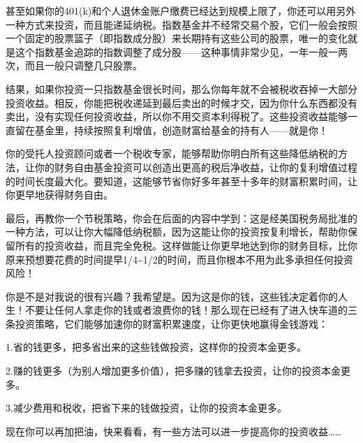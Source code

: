 甚至如果你的401(k)和个人退休金账户缴费已经达到规模上限了，你还可以用另外一种方式来投资，而且能递延纳税。指数基金并不经常交易个股，它们一般会按照一个固定的股票篮子（即指数成分股）来长期持有这些公司的股票，唯一的变化就是这个指数基金追踪的指数调整了成分股——这种事情非常少见，一年一般一两次，而且一般只调整几只股票。

结果，如果你投资一只指数基金很长时间，那么你每年就不会被税收吞掉一大部分投资收益。相反，你能把税收递延到最后卖出的时候才交，因为你什么东西都没有卖出，没有实现任何投资收益，所以你不用交资本利得税了。这些投资收益能够一直留在基金里，持续按照复利增值，创造财富给基金的持有人——就是你！

你的受托人投资顾问或者一个税收专家，能够帮助你明白所有这些降低纳税的方法，让你的财务自由基金投资可以创造出更高的税后净收益，让你的复利增值过程的时间长度最大化。要知道，这能够节省你好多年甚至十多年的财富积累时间，让你更早地获得财务自由。

最后，再教你一个节税策略，你会在后面的内容中学到：这是经美国税务局批准的一种方法，可以让你大幅降低纳税额，因为这能让你的投资按复利增长，帮助你保留所有的投资收益，而且完全免税。这样做能让你更早地达到你的财务目标，比你原来预想要花费的时间提早1/4\textasciitilde{}1/2的时间，而且你根本不用为此多承担任何投资风险！

你是不是对我说的很有兴趣？我希望是。因为这是你的钱，这些钱决定着你的人生！不要让任何人拿走你的钱或者浪费你的钱！那么现在已经有了进入快车道的三条投资策略，它们能够加速你的财富积累速度，让你更快地赢得金钱游戏：

1.省的钱更多，把多省出来的这些钱做投资，这样你的投资本金更多。

2.赚的钱更多（为别人增加更多价值），把多赚的钱拿去投资，让你的投资本金更多。

3.减少费用和税收，把省下来的钱做投资，让你的投资本金更多。

现在你可以再加把油，快来看看，有一些方法可以进一步提高你的投资收益……
